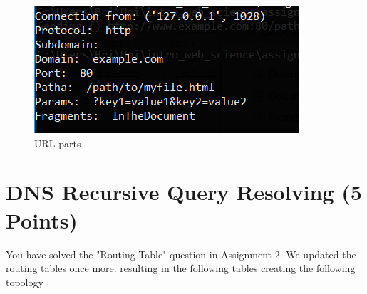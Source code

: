 \documentclass{WeSTassignment}
\begin{document}
\begin{figure}[h]
  \centering
  \includegraphics{splitting_url.png}
   \caption{URL parts}
     \label{fig:dig} 
\end{figure}



\section{DNS Recursive Query Resolving (5 Points)}

You have solved the "Routing Table" question in Assignment 2. We updated the routing tables once more. resulting in the following tables creating the following topology 
\end{document}
